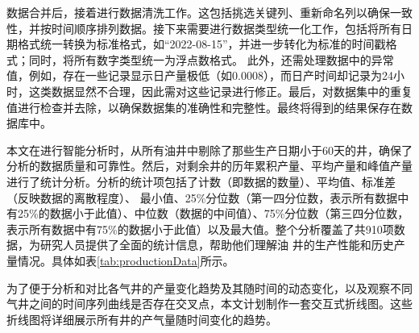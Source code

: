数据合并后，接着进行数据清洗工作。这包括挑选关键列、重新命名列以确保一致性，并按时间顺序排列数据。接下来需要进行数据类型统一化工作，包括将所有日期格式统一转换为标准格式，如“2022-08-15”，并进一步转化为标准的时间戳格式；同时，将所有数字类型统一为浮点数格式。
此外，还需处理数据中的异常值，例如，存在一些记录显示日产量极低（如0.0008），而日产时间却记录为24小时，这类数据显然不合理，因此需对这些记录进行修正。最后，对数据集中的重复值进行检查并去除，以确保数据集的准确性和完整性。最终将得到的结果保存在数据库中。
\begin{table}[H]
    \renewcommand{\arraystretch}{1.5} %
    \centering
    \caption{产量统计数据表}
    \label{tab:productionData}
\end{table}

本文在进行智能分析时，从所有油井中剔除了那些生产日期小于60天的井，确保了分析的数据质量和可靠性。然后，对剩余井的历年累积产量、平均产量和峰值产量进行了统计分析。分析的统计项包括了计数（即数据的数量）、平均值、标准差（反映数据的离散程度）、
最小值、25\%分位数（第一四分位数，表示所有数据中有25\%的数据小于此值）、中位数（数据的中间值）、75\%分位数（第三四分位数，表示所有数据中有75\%的数据小于此值）以及最大值。整个分析覆盖了共910项数据，为研究人员提供了全面的统计信息，帮助他们理解油
井的生产性能和历史产量情况。具体如表\ref{tab:productionData}所示。


为了便于分析和对比各气井的产量变化趋势及其随时间的动态变化，以及观察不同气井之间的时间序列曲线是否存在交叉点，本文计划制作一套交互式折线图。这些折线图将详细展示所有井的产气量随时间变化的趋势。

